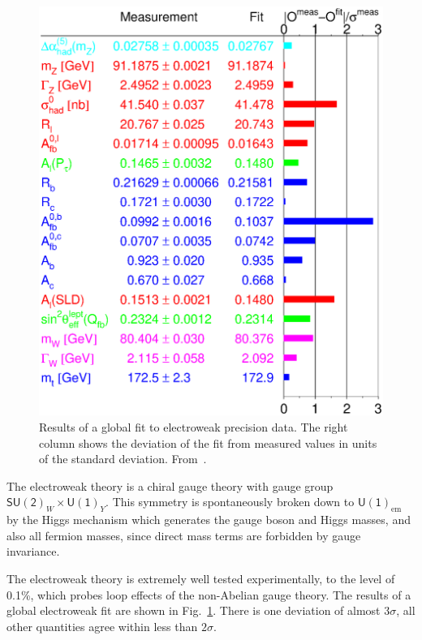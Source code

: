 \documentclass[12pt]{report}
\newcommand{\2}{\ensuremath{\sqrt{2}\,}}
\begin{document}
{      \begin{figure}
        \begin{center}
          \includegraphics[width=\textwidth]{w06_show_pull_18.eps}
        \end{center}
        \caption{\label{fig:ewfit}Results of a global fit to electroweak precision data. The right
          column shows the deviation of the fit from measured values in units of the standard
          deviation. From~\cite{ewwg}.} 
      \end{figure}
    
      The electroweak theory is a chiral gauge theory with gauge group
      $\mathsf{SU(2)}_W \times \mathsf{U(1)}_Y$. This symmetry is spontaneously broken down to 
      $\mathsf{U(1)}_\text{em}$ by the Higgs mechanism which generates the gauge boson and
      Higgs masses, and also  all
      fermion masses, since direct mass terms are forbidden by gauge invariance.

      The electroweak theory is extremely well tested experimentally, to the level of 0.1\%,
      which probes loop effects of the non-Abelian gauge theory. The
      results of a global electroweak fit are shown in Fig.~\ref{fig:ewfit}. There is one deviation
      of almost $3\sigma$, all other quantities agree within less than $2\sigma$.
      
}
\end{document}
